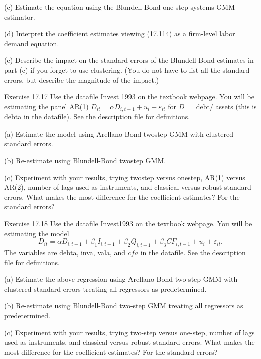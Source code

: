 \documentclass[10pt]{article}
\begin{document}
(c) Estimate the equation using the Blundell-Bond one-step systems GMM estimator.

(d) Interpret the coefficient estimates viewing (17.114) as a firm-level labor demand equation.

(e) Describe the impact on the standard errors of the Blundell-Bond estimates in part (c) if you forget to use clustering. (You do not have to list all the standard errors, but describe the magnitude of the impact.)

Exercise 17.17 Use the datafile Invest 1993 on the textbook webpage. You will be estimating the panel AR(1) $D_{i t}=\alpha D_{i, t-1}+u_{i}+\varepsilon_{i t}$ for $D=$ debt/ assets (this is debta in the datafile). See the description file for definitions.

(a) Estimate the model using Arellano-Bond twostep GMM with clustered standard errors.

(b) Re-estimate using Blundell-Bond twostep GMM.

(c) Experiment with your results, trying twostep versus onestep, AR(1) versus AR(2), number of lags used as instruments, and classical versus robust standard errors. What makes the most difference for the coefficient estimates? For the standard errors?

Exercise 17.18 Use the datafile Invest1993 on the textbook webpage. You will be estimating the model
$$
D_{i t}=\alpha D_{i, t-1}+\beta_{1} I_{i, t-1}+\beta_{2} Q_{i, t-1}+\beta_{3} C F_{i, t-1}+u_{i}+\varepsilon_{i t} .
$$
The variables are debta, inva, vala, and $c f a$ in the datafile. See the description file for definitions.

(a) Estimate the above regression using Arellano-Bond two-step GMM with clustered standard errors treating all regressors as predetermined.

(b) Re-estimate using Blundell-Bond two-step GMM treating all regressors as predetermined.

(c) Experiment with your results, trying two-step versus one-step, number of lags used as instruments, and classical versus robust standard errors. What makes the most difference for the coefficient estimates? For the standard errors?
\end{document}

